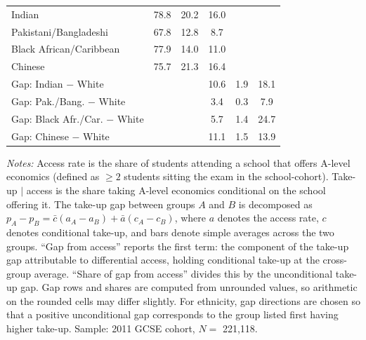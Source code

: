 \begin{table}[htbp]
\begin{tabular}{l ccccc}
Indian                        & 78.8         & 20.2         & 16.0         &            &            \\
Pakistani/Bangladeshi         & 67.8         & 12.8         & 8.7         &            &            \\
Black African/Caribbean       & 77.9         & 14.0         & 11.0         &            &            \\
Chinese                       & 75.7         & 21.3         & 16.4         &            &            \\
\addlinespace
Gap: Indian $-$ White         &            &            & 10.6         & 1.9         & 18.1         \\
Gap: Pak./Bang. $-$ White&            &            & 3.4         & 0.3         & 7.9         \\
Gap: Black Afr./Car. $-$ White &            &            & 5.7         & 1.4         & 24.7         \\
Gap: Chinese $-$ White        &            &            & 11.1         & 1.5         & 13.9         \\
\bottomrule
\end{tabular}
\begin{minipage}{\textwidth}
\smallskip
\footnotesize
\textit{Notes:} Access rate is the share of students attending a school that offers A-level economics (defined as $\geq 2$ students sitting the exam in the school-cohort). Take-up $|$ access is the share taking A-level economics conditional on the school offering it. The take-up gap between groups $A$ and $B$ is decomposed as $p_A - p_B = \bar{c}(a_A - a_B) + \bar{a}(c_A - c_B)$, where $a$ denotes the access rate, $c$ denotes conditional take-up, and bars denote simple averages across the two groups. ``Gap from access'' reports the first term: the component of the take-up gap attributable to differential access, holding conditional take-up at the cross-group average. ``Share of gap from access'' divides this by the unconditional take-up gap. Gap rows and shares are computed from unrounded values, so arithmetic on the rounded cells may differ slightly. For ethnicity, gap directions are chosen so that a positive unconditional gap corresponds to the group listed first having higher take-up. Sample: 2011 GCSE cohort, $N = $ 221,118.
\end{minipage}
\end{table}
